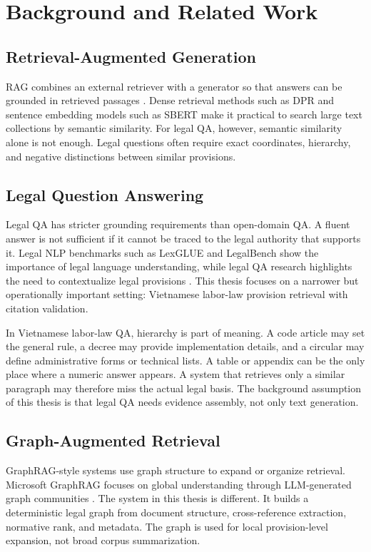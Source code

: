 \section{Background and Related Work}

\subsection{Retrieval-Augmented Generation}
RAG combines an external retriever with a generator so that answers can be grounded in retrieved passages \cite{lewis2020retrieval}. Dense retrieval methods such as DPR \cite{karpukhin2020dense} and sentence embedding models such as SBERT \cite{reimers2019sentencebert} make it practical to search large text collections by semantic similarity. For legal QA, however, semantic similarity alone is not enough. Legal questions often require exact coordinates, hierarchy, and negative distinctions between similar provisions.

\subsection{Legal Question Answering}
Legal QA has stricter grounding requirements than open-domain QA. A fluent answer is not sufficient if it cannot be traced to the legal authority that supports it. Legal NLP benchmarks such as LexGLUE \cite{chalkidis2021lexglue} and LegalBench \cite{guha2023legalbench} show the importance of legal language understanding, while legal QA research highlights the need to contextualize legal provisions \cite{zhong2020legalqa}. This thesis focuses on a narrower but operationally important setting: Vietnamese labor-law provision retrieval with citation validation.

In Vietnamese labor-law QA, hierarchy is part of meaning. A code article may set the general rule, a decree may provide implementation details, and a circular may define administrative forms or technical lists. A table or appendix can be the only place where a numeric answer appears. A system that retrieves only a similar paragraph may therefore miss the actual legal basis. The background assumption of this thesis is that legal QA needs evidence assembly, not only text generation.

\subsection{Graph-Augmented Retrieval}
GraphRAG-style systems use graph structure to expand or organize retrieval. Microsoft GraphRAG focuses on global understanding through LLM-generated graph communities \cite{edge2024graphrag}. The system in this thesis is different. It builds a deterministic legal graph from document structure, cross-reference extraction, normative rank, and metadata. The graph is used for local provision-level expansion, not broad corpus summarization.


